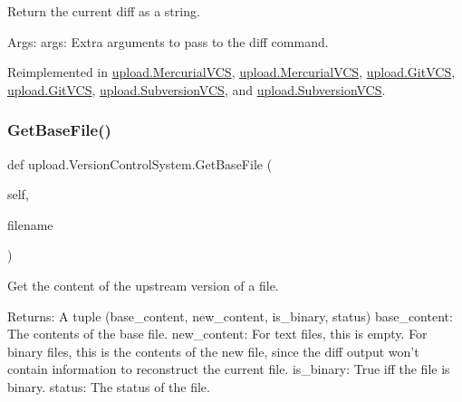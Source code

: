 \begin{DoxyVerb}Return the current diff as a string.

Args:
  args: Extra arguments to pass to the diff command.
\end{DoxyVerb}
 

Reimplemented in \mbox{\hyperlink{classupload_1_1_mercurial_v_c_s_a6c05746012d8cd435c94ace1465671ef}{upload.\+Mercurial\+V\+CS}}, \mbox{\hyperlink{classupload_1_1_mercurial_v_c_s_a6c05746012d8cd435c94ace1465671ef}{upload.\+Mercurial\+V\+CS}}, \mbox{\hyperlink{classupload_1_1_git_v_c_s_a3ebfc01cebc9b585706ad3f4389a8833}{upload.\+Git\+V\+CS}}, \mbox{\hyperlink{classupload_1_1_git_v_c_s_a3ebfc01cebc9b585706ad3f4389a8833}{upload.\+Git\+V\+CS}}, \mbox{\hyperlink{classupload_1_1_subversion_v_c_s_a07c2d341f2c7df2772dd7f85e89b0212}{upload.\+Subversion\+V\+CS}}, and \mbox{\hyperlink{classupload_1_1_subversion_v_c_s_a07c2d341f2c7df2772dd7f85e89b0212}{upload.\+Subversion\+V\+CS}}.

\mbox{\label{classupload_1_1_version_control_system_adfd9d4ecba422102233a2ba13e5bfaf5}} 
\subsubsection{\texorpdfstring{GetBaseFile()}{GetBaseFile()}\hspace{0.1cm}{\footnotesize\ttfamily [1/2]}}
{\footnotesize\ttfamily def upload.\+Version\+Control\+System.\+Get\+Base\+File (\begin{DoxyParamCaption}\item[{}]{self,  }\item[{}]{filename }\end{DoxyParamCaption})}

\begin{DoxyVerb}Get the content of the upstream version of a file.

Returns:
  A tuple (base_content, new_content, is_binary, status)
base_content: The contents of the base file.
new_content: For text files, this is empty.  For binary files, this is
  the contents of the new file, since the diff output won't contain
  information to reconstruct the current file.
is_binary: True iff the file is binary.
status: The status of the file.
\end{DoxyVerb}
 

